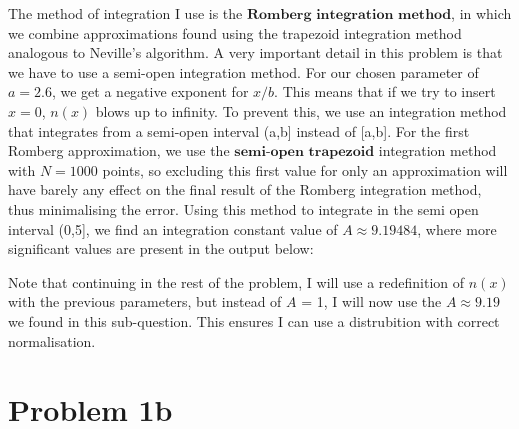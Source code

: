 The method of integration I use is the $\textbf{Romberg integration method}$, in which we combine approximations found using the trapezoid integration method analogous to Neville's algorithm. A very important detail in this problem is that we have to use a semi-open integration method. For our chosen parameter of $a = 2.6$, we get a negative exponent for $x/b$. This means that if we try to insert $x = 0$, $n(x)$ blows up to infinity. To prevent this, we use an integration method that integrates from a semi-open interval (a,b] instead of [a,b]. For the first Romberg approximation, we use the $\textbf{semi-open trapezoid}$ integration method with $N =1000$ points, so excluding this first value for only an approximation will have barely any effect on the final result of the Romberg integration method, thus minimalising the error. Using this method to integrate in the semi open interval (0,5], we find an integration constant value of $A \approx 9.19484$, where more significant values are present in the output below: 

%

Note that continuing in the rest of the problem, I will use a redefinition of $n(x)$ with the previous parameters, but instead of $A$ = 1, I will now use the $A \approx 9.19$ we found in this sub-question. This ensures I can use a distrubition with correct normalisation. 

\section*{Problem 1b}

